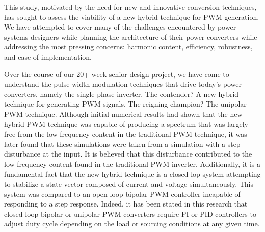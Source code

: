 This study, motivated by the need for new and innovative conversion techniques, has sought to assess the viability of a new hybrid technique for PWM generation. We have attempted to cover many of the challenges encountered by power systems designers while planning the architecture of their power converters while addressing the most pressing concerns: harmonic content, efficiency, robustness, and ease of implementation.

Over the course of our 20+ week senior design project, we have come to understand the pulse-width modulation techniques that drive today's power converters, namely the single-phase inverter. The contender? A new hybrid technique for generating PWM signals. The reigning champion? The unipolar PWM technique. Although initial numerical results had shown that the new hybrid PWM technique was capable of producing a spectrum that was largely free from the low frequency content in the traditional PWM technique, it was later found that these simulations were taken from a simulation with a step disturbance at the input. It is believed that this disturbance contributed to the low frequency content found in the traditional PWM inverter. Additionally, it is a fundamental fact that the new hybrid technique is a closed lop system attempting to stabilize a state vector composed of current and voltage simultaneously. This system was compared to an open-loop bipolar PWM controller incapable of responding to a step response. Indeed, it has been stated in this research that closed-loop bipolar or unipolar PWM converters require PI or PID controllers to adjust duty cycle depending on the load or sourcing conditions at any given time. 

 


